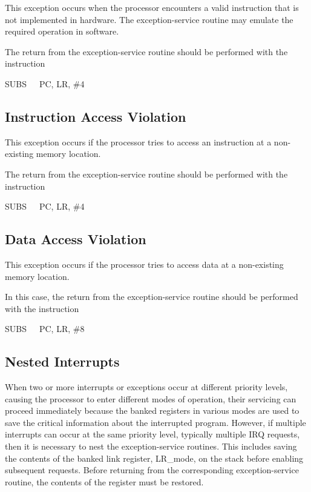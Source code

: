 \documentclass[11pt, twoside, pdftex]{article}
\begin{document}
This exception occurs when the processor encounters a valid
instruction that is not implemented in hardware. 
The exception-service routine may emulate the required operation
in software.

The return from the exception-service routine should be performed
with the instruction
\begin{center}
SUBS~~~PC, LR, \#4
\end{center}
\noindent

\subsection{Instruction Access Violation}

This exception occurs if the processor tries to access an
instruction at a non-existing memory location.

The return from the exception-service routine should be performed
with the instruction
\begin{center}
SUBS~~~PC, LR, \#4
\end{center}
\noindent

\subsection{Data Access Violation}

This exception occurs if the processor tries to access data
at a non-existing memory location.

In this case, the return from the exception-service routine
should be performed with the instruction
\begin{center}
SUBS~~~PC, LR, \#8
\end{center}
\noindent

\subsection{Nested Interrupts}

When two or more interrupts or exceptions occur at different
priority levels, causing the processor to enter different
modes of operation, their servicing can proceed immediately
because the banked registers in various modes are used to save 
the critical information about the interrupted program.
However, if multiple interrupts can occur at the same priority
level, typically multiple IRQ requests, then it is necessary
to nest the exception-service routines. This includes saving
the contents of the banked link register, LR\_mode,
on the stack before enabling subsequent
requests. Before returning from the corresponding
exception-service routine, the contents of the register must
be restored.
\end{document}

